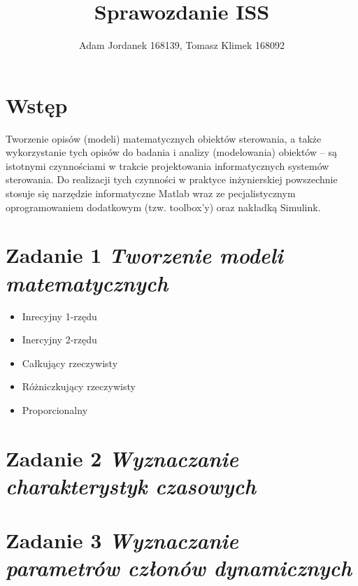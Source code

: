 \documentclass[a4paper,10pt]{article}
\title{Sprawozdanie ISS}
\author{Adam Jordanek 168139, Tomasz Klimek 168092}
\begin{document}
\maketitle
 
 
\section{Wstęp}\label{sec:wstep}
Tworzenie opisów (modeli) matematycznych obiektów sterowania, a także wykorzystanie tych opisów do badania i analizy (modelowania) obiektów – są istotnymi czynnościami w trakcie projektowania informatycznych systemów sterowania. Do realizacji tych czynności w praktyce inżynierskiej powszechnie stosuje się narzędzie informatyczne Matlab wraz ze pecjalistycznym oprogramowaniem dodatkowym (tzw. toolbox’y) oraz nakładką Simulink.
 
\section{Zadanie 1 \textit{\small Tworzenie modeli matematycznych}}\label{sec:zad1}
\begin{itemize}
\item Inrecyjny 1-rzędu
\item Inercyjny 2-rzędu
\item Całkujący rzeczywisty
\item Różniczkujący rzeczywisty
\item Proporcionalny
\end{itemize}
\section{Zadanie 2 \textit{\small Wyznaczanie charakterystyk czasowych}}\label{sec:zad2}
\section{Zadanie 3 \textit{\small Wyznaczanie parametrów członów dynamicznych}}\label{sec:zad3}

 
\end{document}
